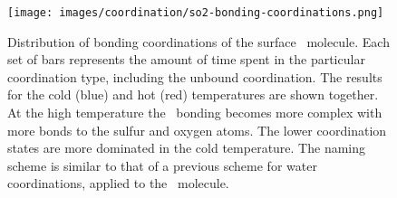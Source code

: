 

\begin{figure}[h!]
	\begin{center}
		\texttt{[image: images/coordination/so2-bonding-coordinations.png]}
		\caption{Distribution of bonding coordinations of the surface \suldiox~molecule. Each set of bars represents the amount of time spent in the particular coordination type, including the unbound coordination. The results for the cold (blue) and hot (red) temperatures are shown together. At the high temperature the \suldiox~bonding becomes more complex with more bonds to the sulfur and oxygen atoms. The lower coordination states are more dominated in the cold temperature. The naming scheme is similar to that of a previous scheme for water coordinations,\cite{Buch2005} applied to the \suldiox~molecule.}
		\label{fig:so2-bonding-coordinations}
	\end{center}
\end{figure}


